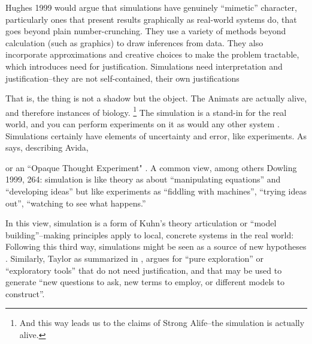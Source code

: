 Hughes 1999 would argue that simulations have genuinely ``mimetic'' character, particularly ones that present results graphically as
real-world systems do, that goes beyond plain number-crunching. They use a variety of methods beyond calculation (such as graphics) to draw
inferences from data. They also incorporate approximations and creative choices to make the problem tractable, which introduces need for
justification. Simulations need interpretation and justification--they are not self-contained, their own justifications
\autocite[31]{Winsberg2010}

\label{simulations-are-themselves-an-instance-of-the-thing}

That is, the thing is not a shadow but the object. The Animats are actually alive, and therefore instances of biology.
\footnote{And this way leads us to the claims of Strong Alife--the simulation is actually alive.}
The simulation is a stand-in for the real world, and you can perform experiments on it as would any other system \autocite[31]{Winsberg2010}. Simulations certainly have elements of uncertainty and error, like experiments. As \autocite{Adami2002} says, describing Avida, 

\label{a-third-way-neither-experimental-or-theoretical}

\autocite[31]{Winsberg2010} or an ``Opaque Thought Experiment" \autocite{DiPaolo2000}. A common view, among others Dowling 1999, 264: simulation is like theory as about ``manipulating equations'' and ``developing ideas'' but like experiments as ``fiddling with machines'', ``trying ideas out'', ``watching to see what happens.'' 

In this view, simulation is a form of Kuhn's theory articulation or ``model building''--making principles apply to local, concrete systems in the real world:  Following this third way, simulations might be seen as a source of new hypotheses \autocite{Eldridge}. Similarly, Taylor as summarized in \autocite{Webb2009}, argues for ``pure exploration'' or ``exploratory tools'' that do not need justification, and that may be used to generate ``new questions to ask, new terms to employ, or different models to construct''.

